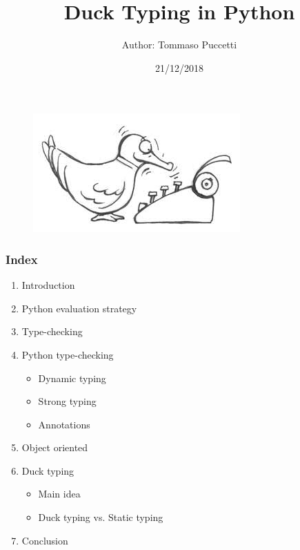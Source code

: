 \documentclass[xcolor ={table,usenames,dvipsnames}]{beamer}
\title{Duck Typing in Python}
\author{Author: Tommaso Puccetti}
\institute{Universit\`a  degli Studi di Firenze}
\date{21/12/2018}
\theoremstyle{definition}
\begin{document}
	
	\begin{frame}
		\maketitle
			\begin{figure}[h!]
			\centering
			\includegraphics[scale=2]{img/cartoonduck.jpg}
			\label{Interfacce di un CS}
		\end{figure}
	\end{frame}

	\begin{frame}
		\frametitle{Index}
		\begin{enumerate}
			\item Introduction
			\item Python evaluation strategy
			\item Type-checking
			\item Python type-checking
			 \begin{itemize}
					\item Dynamic typing
					\item Strong typing
					\item Annotations
				  \end{itemize}
			\item Object oriented
			\item Duck typing
				\begin{itemize}
				  	\item Main idea
				  	\item Duck typing vs. Static typing
				  \end{itemize}
			\item Conclusion
		\end{enumerate}
	\end{frame}
\end{document}
